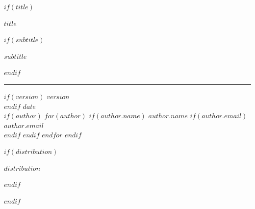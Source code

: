 \documentclass[
    $if(fontsize)$$fontsize$$else$10pt$endif$,
    $if(papersize)$$papersize$$else$letterpaper$endif$,
    titlepage,
    oneside,
    openright,
    $if(draft)$draft$else$final$endif$,
    article]{memoir}
\begin{document}
%
$if(title)$
    \ifpdf
    \fi
    \newlength{\centeroffset}
    \thispagestyle{empty}
    \vspace*{1.5in}
    \begin{flushright}
        {
            {\fontsize{20pt}{24pt}$title$\par}
            \vspace{-0.06in}
            $if(subtitle)$
                {\fontsize{18pt}{21.6pt}$subtitle$\par}
            $endif$
        }
        \noindent\rule[-1.2pt]{\textwidth}{0.1pt}

        $if(version)$
            {\fontsize{12pt}{14.4pt}
                \space $version$\\[0.05in]
            }
        $endif$
        {\fontsize{12pt}{14.4pt}$date$}\\[0.05in]


        \vspace{2.5in}
        $if(author)$
            $for(author)$
                $if(author.name)$
                    {\fontsize{12pt}{14.4pt}$author.name$}
                    $if(author.email)$
                        {\\\fontsize{12pt}{14.4pt}$author.email$\\[0.2in]}
                    $endif$
                $endif$
            $endfor$
        $endif$

        \vspace*{\fill}
        $if(distribution)$
            {\fontsize{11pt}{13.2pt}$distribution$\par}
        $endif$
    \end{flushright}
$endif$
\end{document}
